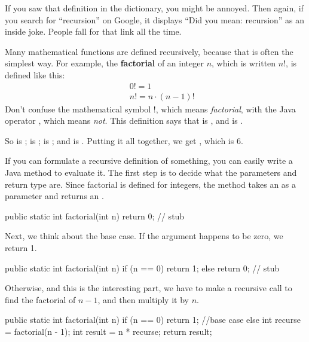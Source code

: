 
If you saw that definition in the dictionary, you might be annoyed.
Then again, if you search for ``recursion'' on Google, it displays ``Did you mean: recursion'' as an inside joke.
People fall for that link all the time.


Many mathematical functions are defined recursively, because that is often the simplest way.
For example, the {\bf factorial} of an integer $n$, which is written $n!$, is defined like this:
%
\begin{eqnarray*}
&&  0! = 1 \\ 
&&  n! = n \cdot(n-1)!
\end{eqnarray*}
%
Don't confuse the mathematical symbol $!$, which means {\em factorial}, with the Java operator \java{!}, which means {\em not}.
This definition says that  is , and  is .

So  is ;  is ;  is ; and  is .
Putting it all together, we get , which is 6.

If you can formulate a recursive definition of something, you can easily write a Java method to evaluate it.
The first step is to decide what the parameters and return type are.
Since factorial is defined for integers, the method takes an  as a parameter and returns an .

\begin{code}
public static int factorial(int n) {
    return 0;  // stub
}
\end{code}

Next, we think about the base case.
If the argument happens to be zero, we return 1.

\begin{code}
public static int factorial(int n) {
    if (n == 0) {
        return 1;
    } else {
        return 0;  // stub
    }
}
\end{code}

Otherwise, and this is the interesting part, we have to make a recursive call to find the factorial of $n-1$, and then multiply it by $n$.

\begin{code}
public static int factorial(int n) {
    if (n == 0) {
        return 1; //base case
    } else {
        int recurse = factorial(n - 1);
        int result = n * recurse;
        return result;
    }
}
\end{code}


